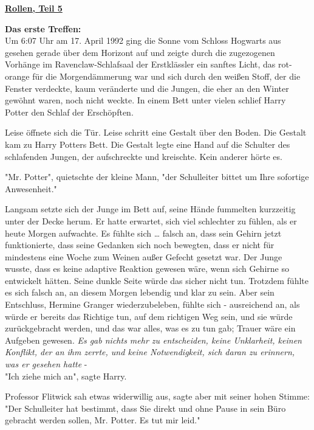 

\hypertarget{rollen-teil-5}{%

\textbf{\uline{Rollen, Teil 5}}

\textbf{Das erste Treffen:}\\ Um 6:07 Uhr am 17. April 1992 ging die Sonne vom Schloss Hogwarts aus gesehen gerade über dem Horizont auf und zeigte durch die zugezogenen Vorhänge im Ravenclaw-Schlafsaal der Erstklässler ein sanftes Licht, das rot-orange für die Morgendämmerung war und sich durch den weißen Stoff, der die Fenster verdeckte, kaum veränderte und die Jungen, die eher an den Winter gewöhnt waren, noch nicht weckte. In einem Bett unter vielen schlief Harry Potter den Schlaf der Erschöpften.

Leise öffnete sich die Tür. Leise schritt eine Gestalt über den Boden. Die Gestalt kam zu Harry Potters Bett. Die Gestalt legte eine Hand auf die Schulter des schlafenden Jungen, der aufschreckte und kreischte. Kein anderer hörte es.

"Mr. Potter", quietschte der kleine Mann, "der Schulleiter bittet um Ihre sofortige Anwesenheit."

Langsam setzte sich der Junge im Bett auf, seine Hände fummelten kurzzeitig unter der Decke herum. Er hatte erwartet, sich viel schlechter zu fühlen, als er heute Morgen aufwachte. Es fühlte sich … falsch an, dass sein Gehirn jetzt funktionierte, dass seine Gedanken sich noch bewegten, dass er nicht für mindestens eine Woche zum Weinen außer Gefecht gesetzt war. Der Junge wusste, dass es keine adaptive Reaktion gewesen wäre, wenn sich Gehirne so entwickelt hätten. Seine dunkle Seite würde das sicher nicht tun. Trotzdem fühlte es sich falsch an, an diesem Morgen lebendig und klar zu sein. Aber sein Entschluss, Hermine Granger wiederzubeleben, fühlte sich - ausreichend an, als würde er bereits das Richtige tun, auf dem richtigen Weg sein, und sie würde zurückgebracht werden, und das war alles, was es zu tun gab; Trauer wäre ein Aufgeben gewesen. \emph{Es gab nichts mehr zu entscheiden, keine Unklarheit, keinen Konflikt, der an ihm zerrte, und keine Notwendigkeit, sich daran zu erinnern, was er gesehen hatte} -\\ "Ich ziehe mich an", sagte Harry.

Professor Flitwick sah etwas widerwillig aus, sagte aber mit seiner hohen Stimme: "Der Schulleiter hat bestimmt, dass Sie direkt und ohne Pause in sein Büro gebracht werden sollen, Mr. Potter. Es tut mir leid."

}
